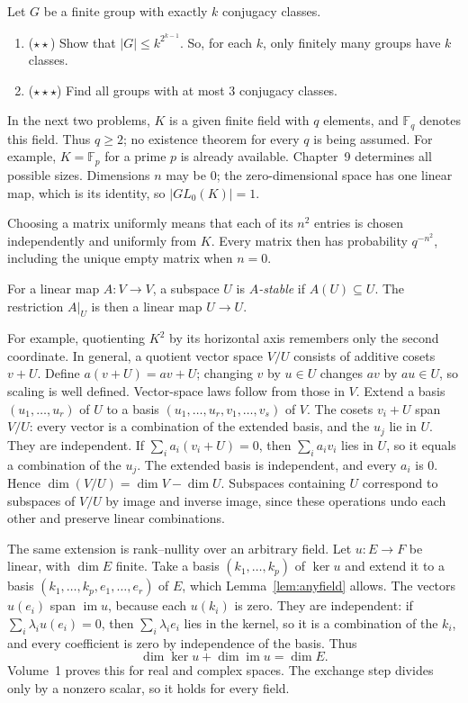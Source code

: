 \begin{exercise}\label{pb:landau}
Let $G$ be a finite group with exactly $k$ conjugacy classes.
\begin{enumerate}[label=(\alph*)]
\item ($\star\star$) Show that $|G|\le k^{2^{k-1}}$. So, for each $k$, only finitely many groups have $k$ classes.
\item ($\star\star\star$) Find all groups with at most $3$ conjugacy classes.
\end{enumerate}
\end{exercise}

\begin{reminder}
In the next two problems, $K$ is a given finite field with $q$ elements, and $\mathbb F_q$ denotes this field. Thus $q\ge2$; no existence theorem for every $q$ is being assumed. For example, $K=\mathbb F_p$ for a prime $p$ is already available. Chapter~9 determines all possible sizes. Dimensions $n$ may be $0$; the zero-dimensional space has one linear map, which is its identity, so $|GL_0(K)|=1$.

Choosing a matrix uniformly means that each of its $n^2$ entries is chosen
independently and uniformly from $K$. Every matrix then has probability
$q^{-n^2}$, including the unique empty matrix when $n=0$.

For a linear map $A:V\to V$, a subspace $U$ is \emph{$A$-stable} if
$A(U)\subseteq U$. The restriction $A|_U$ is then a linear map $U\to U$.

For example, quotienting $K^2$ by its horizontal axis remembers only the second coordinate. In general, a quotient vector space $V/U$ consists of additive cosets $v+U$. Define $a(v+U)=av+U$; changing $v$ by $u\in U$ changes $av$ by $au\in U$, so scaling is well defined. Vector-space laws follow from those in $V$. Extend a basis $(u_1,\dots,u_r)$ of $U$ to a basis $(u_1,\dots,u_r,v_1,\dots,v_s)$ of $V$. The cosets $v_i+U$ span $V/U$: every vector is a combination of the extended basis, and the $u_j$ lie in $U$. They are independent. If $\sum_i a_i(v_i+U)=0$, then $\sum_i a_iv_i$ lies in $U$, so it equals a combination of the $u_j$. The extended basis is independent, and every $a_i$ is $0$. Hence $\dim(V/U)=\dim V-\dim U$. Subspaces containing $U$ correspond to subspaces of $V/U$ by image and inverse image, since these operations undo each other and preserve linear combinations.

The same extension is rank--nullity over an arbitrary field. Let $u:E\to F$ be linear, with $\dim E$ finite. Take a basis $(k_1,\dots,k_p)$ of $\ker u$ and extend it to a basis $(k_1,\dots,k_p,e_1,\dots,e_r)$ of $E$, which Lemma~\ref{lem:anyfield} allows. The vectors $u(e_i)$ span $\operatorname{im}u$, because each $u(k_i)$ is zero. They are independent: if $\sum_i\lambda_iu(e_i)=0$, then $\sum_i\lambda_ie_i$ lies in the kernel, so it is a combination of the $k_i$, and every coefficient is zero by independence of the basis. Thus
\[
\dim\ker u+\dim\operatorname{im}u=\dim E.
\]
Volume~1 proves this for real and complex spaces. The exchange step divides only by a nonzero scalar, so it holds for every field.


\end{reminder}
